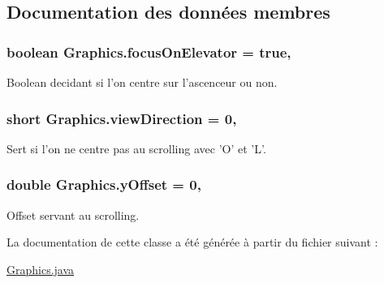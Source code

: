 \subsection{Documentation des données membres}
\hypertarget{classGraphics_a3622c075b72c6c266ee72ca04988ab3f}{
\subsubsection[{focus\-On\-Elevator}]{\setlength{\rightskip}{0pt plus 5cm}boolean Graphics.\-focus\-On\-Elevator = true\hspace{0.3cm}{\ttfamily [static]}, {\ttfamily [package]}}}\label{classGraphics_a3622c075b72c6c266ee72ca04988ab3f}


Boolean decidant si l'on centre sur l'ascenceur ou non. 

\hypertarget{classGraphics_a0ce58ea07f00e09025d11fb9c9085b1b}{
\subsubsection[{view\-Direction}]{\setlength{\rightskip}{0pt plus 5cm}short Graphics.\-view\-Direction = 0\hspace{0.3cm}{\ttfamily [static]}, {\ttfamily [package]}}}\label{classGraphics_a0ce58ea07f00e09025d11fb9c9085b1b}


Sert si l'on ne centre pas au scrolling avec 'O' et 'L'. 

\hypertarget{classGraphics_a005723dda272a11cb27933d59f4d90af}{
\subsubsection[{y\-Offset}]{\setlength{\rightskip}{0pt plus 5cm}double Graphics.\-y\-Offset = 0\hspace{0.3cm}{\ttfamily [static]}, {\ttfamily [package]}}}\label{classGraphics_a005723dda272a11cb27933d59f4d90af}


Offset servant au scrolling. 



La documentation de cette classe a été générée à partir du fichier suivant \-:\begin{DoxyCompactItemize}
\item 
\hyperlink{Graphics_8java}{Graphics.\-java}\end{DoxyCompactItemize}

